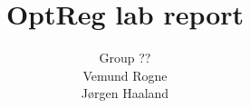 \documentclass{article}
\title{OptReg lab report}
\author{Group ??\\Vemund Rogne\\Jørgen Haaland}
\begin{document}


\newpage
\setcounter{page}{1}



\clearpage



\clearpage



\clearpage


\begin{figure}
    \begin{center}
        
    \end{center}
\end{figure}


\newpage
{}


\label{sec:bibliography}
\end{document}
